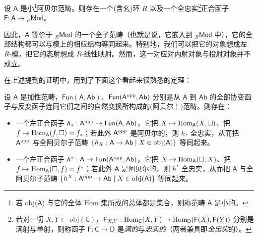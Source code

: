 \begin{Thm}
	设 $\mathsf{A}$ 是小\footnote{若 obj($\mathsf{A}$) 与它的全体 Hom 集所成的总体都是集合，则称范畴 $\mathsf{A}$ 是小的。}阿贝尔范畴。则存在一个\textup(含幺\textup)环 $R$ 以及一个全忠实\footnote{若对一切 $X, Y \in$ obj$(\mathsf{C})$，$\mathsf{F}_{X,Y}:\textup{Hom}_\mathsf{C}(X,Y)\rightarrow\textup{Hom}_\mathsf{D}(\mathsf{F}(X),\mathsf{F}(Y))$ 分别是满射与单射，则称函子 $\mathsf{F}:\mathsf{C}\rightarrow\mathsf{D}$ 是\textit{满的}与\textit{忠实的}（两者兼具即\textit{全忠实}的）。}正合函子 $\mathsf{F}:\mathsf{A}\rightarrow{}_R\mathsf{Mod}$。
\end{Thm}


因此，$\mathsf{A}$ 等价于 ${}_R\mathsf{Mod}$ 的一个全子范畴（也就是说，它嵌入到 ${}_R\mathsf{Mod}$ 中），它的全部结构都可以与模上的相应结构等同起来。特别地，我们可以把它的对象想成左 $R$-模，把它的态射想成 $R$-线性映射。然而，这一对应对内射对象与投射对象并不成立。

在上述提到的证明中，用到了下面这个看起来很熟悉的定理：

\begin{Thm}\label{YonedaEmbThm}
	设 $\mathsf{A}$ 是加性范畴，$\mathsf{Fun}(\mathsf{A},\mathsf{Ab})$、$\mathsf{Fun}(\mathsf{A}^\textup{opp},\mathsf{Ab})$ 分别是从 $\mathsf{A}$ 到 $\mathsf{Ab}$ 的全部协变函子与反变函子连同它们之间的自然变换所构成的\textup(阿贝尔！\textup)范畴。则存在：
	\begin{itemize}	
		\item 一个左正合函子 $h_*:\mathsf{A}^\textup{opp}\rightarrow\mathsf{Fun}(\mathsf{A},\mathsf{Ab})$，它把 $X\mapsto\textup{Hom}_\mathsf{A}(X,\square)$、把 $f\mapsto\textup{Hom}_\mathsf{A}(f,\square)=f_*$；若此外 $\mathsf{A}^\textup{opp}$ 是阿贝尔的，则 $h_*$ 全忠实，从而把 $\mathsf{A}^\textup{opp}$ 与全阿贝尔子范畴 $\{h_X:\mathsf{A}\rightarrow\mathsf{Ab}\mid X\in\textup{obj}(\mathsf{A})\}$ 等同起来。

		\item 一个左正合函子 $h^*:\mathsf{A}\rightarrow\mathsf{Fun}(\mathsf{A}^\textup{opp},\mathsf{Ab})$，它把 $X\mapsto\textup{Hom}_\mathsf{A}(\square, X)$、把 $f\mapsto\textup{Hom}_\mathsf{A}(\square, f)=f^*$；若此外 $\mathsf{A}$ 是阿贝尔的，则 $h^*$ 全忠实，从而把 $\mathsf{A}$ 与全阿贝尔子范畴 $\{h^X:\mathsf{A}^\textup{opp}\rightarrow\mathsf{Ab}\mid X\in\textup{obj}(\mathsf{A})\}$ 等同起来。
	\end{itemize} 
\end{Thm}

